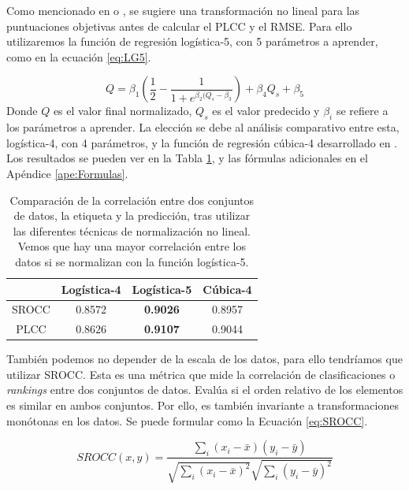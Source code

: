 Como mencionado en \cite{ResSCNN} o \cite{VQA-PC}, se sugiere una transformación 
no lineal para las puntuaciones objetivas antes de calcular el PLCC y el RMSE.
Para ello utilizaremos la función de regresión logística-5, con 5 parámetros a aprender,
como en la ecuación \eqref{eq:LG5}. 

\begin{equation}
  Q = \beta_1 \left(\frac{1}{2} - \frac{1}{1+e^{\beta_2 (Q_s-\beta_3}} \right) + \beta_4 Q_s + \beta_5
  \label{eq:LG5}
\end{equation}
Donde $Q$ es el valor final normalizado, $Q_s$ es el valor predecido y $\beta_i$ se 
refiere a los parámetros a aprender.
La elección se debe al análisis comparativo entre esta, logística-4, con 4 parámetros, y la función de regresión cúbica-4
desarrollado en \cite{ResSCNN}. Los resultados se pueden ver en la Tabla \ref{tab:CompareNonLineal}, 
y las fórmulas adicionales en el Apéndice \ref{ape:Formulas}.

\begin{table}[htp]
  \centering
  \scriptsize
  \begin{tabular}{|c|c|c|c|}
    \hline
    \rowcolor[HTML]{FFC702} 
    & \textbf{Logística-4} & \textbf{Logística-5} & \textbf{Cúbica-4} \\
    \hline 
    SROCC & 0.8572 & \textbf{0.9026} & 0.8957\\
    PLCC & 0.8626 & \textbf{0.9107} & 0.9044 \\
    \hline 
  \end{tabular}
\caption[Comparativa entre funciones de normalización.]{Comparación de la correlación entre dos conjuntos de datos, la etiqueta y 
  la predicción, tras utilizar las diferentes técnicas de normalización no lineal. 
Vemos que hay una mayor correlación entre los datos si se normalizan con la 
función logística-5.}
  \label{tab:CompareNonLineal}
\end{table}
También podemos no depender de la escala de los datos, para ello tendríamos que 
utilizar SROCC.
Esta es una métrica que mide la correlación de clasificaciones o \emph{rankings} entre 
dos conjuntos de datos. Evalúa si el orden relativo de los elementos es similar 
en ambos conjuntos. Por ello, es también invariante a transformaciones monótonas 
en los datos. Se puede formular como la Ecuación \ref{eq:SROCC}.

\begin{equation}
  SROCC(x,y) = \frac{\sum_i (x_i - \bar x)(y_i - \bar y)}{\sqrt{\sum_i (x_i - \bar x)^2}\sqrt{\sum_i (y_i - \bar y)^2}}
\label{eq:SROCC}
\end{equation}


